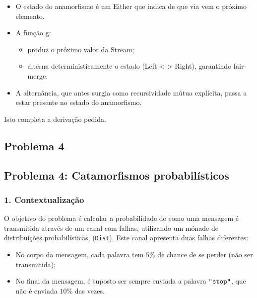 \documentclass[11pt, a4paper, fleqn]{article}
\begin{document}
\begin{itemize}
    \item O estado do anamorfismo é um Either que indica de que via vem o próximo elemento.
    \item A função g:
    \begin{itemize}
        \item produz o próximo valor da Stream;
        \item alterna deterministicamente o estado (Left <-> Right), garantindo fair-merge.
    \end{itemize}
    \item A alternância, que antes surgia como recursividade mútua explícita, passa a estar presente no estado do anamorfismo.
\end{itemize}

\noindent Isto completa a derivação pedida.


\subsection*{Problema 4}

\subsection*{Problema 4: Catamorfismos probabilísticos}


\subsubsection*{1. Contextualização}

\noindent O objetivo do problema é calcular a probabilidade de como uma mensagem é transmitida através de um canal com falhas, utilizando um mónade de distribuições probabilísticas, (\texttt{Dist}).
Este canal apresenta duas falhas diferentes:
\begin{itemize}
    \item No corpo da mensagem, cada palavra tem $5\%$ de chance de se perder (não ser transmitida);
    \item No final da mensagem, é suposto ser sempre enviada a palavra \ensuremath{\text{\ttfamily \char34 stop\char34}}, que não é enviada $10\%$ das vezes.
\end{itemize}
\end{document}
